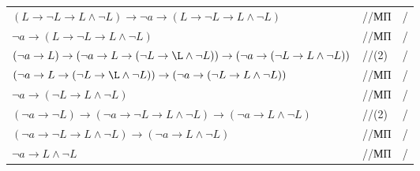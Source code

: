 \documentclass[12pt]{article}
\begin{document}
\begin{tabular*}{\textwidth}{l l l}
	$(L\to\neg L\to L\wedge\neg L)\to \neg a\to(L\to\neg L\to L\wedge\neg L)$ &//МП&/\\
	$\neg a\to(L\to\neg L\to L\wedge\neg L)$ &//МП&/\\
	$(\neg a\to L)\to(\neg a\to L\to(\neg L\to\L\wedge\neg L))\to(\neg a\to(\neg L\to L\wedge\neg L))$ &//(2)&/\\
	$(\neg a\to L\to(\neg L\to\L\wedge\neg L))\to(\neg a\to(\neg L\to L\wedge\neg L))$ &//МП&/\\
	$\neg a\to(\neg L\to L\wedge\neg L)$ &//МП&/\\
	$(\neg a\to \neg L)\to(\neg a\to \neg L\to L\wedge\neg L)\to(\neg a\to L\wedge\neg L)$ &//(2)&/\\
	$(\neg a\to \neg L\to L\wedge\neg L)\to(\neg a\to L\wedge\neg L)$ &//МП&/\\
	$\neg a\to L\wedge\neg L$ &//МП&/\\
\end{tabular*}
\end{document}

